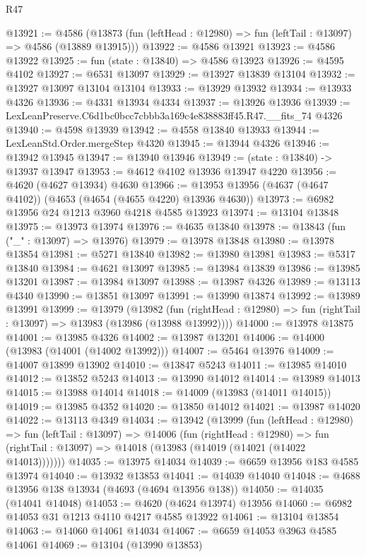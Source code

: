 \begin{lexlean}{R47}
\begin{coremodule}
@13921 := @4586
    (@13873 (fun (leftHead : @12980) => fun (leftTail : @13097) => @4586 (@13889 @13915)))
@13922 := @4586 @13921
@13923 := @4586 @13922
@13925 := fun (state : @13840) => @4586 @13923
@13926 := @4595 @4102
@13927 := @6531 @13097
@13929 := @13927 @13839 @13104
@13932 := @13927 @13097 @13104 @13104
@13933 := @13929 @13932
@13934 := @13933 @4326
@13936 := @4331 @13934 @4334
@13937 := @13926 @13936
@13939 := LexLeanPreserve.C6d1bc0bcc7cbbb3a169c4e838883ff45.R47.__fits_74 @4326
@13940 := @4598 @13939
@13942 := @4558 @13840 @13933
@13944 := LexLeanStd.Order.mergeStep @4320
@13945 := @13944 @4326
@13946 := @13942 @13945
@13947 := @13940 @13946
@13949 := (state : @13840) -> @13937 @13947
@13953 := @4612 @4102 @13936 @13947 @4220
@13956 := @4620 (@4627 @13934) @4630
@13966 := @13953 @13956 (@4637 (@4647 @4102)) (@4653 (@4654 (@4655 @4220) @13936 @4630))
@13973 := @6982 @13956 @24 @1213 @3960 @4218 @4585 @13923
@13974 := @13104 @13848
@13975 := @13973 @13974
@13976 := @4635 @13840
@13978 := @13843 (fun ("_" : @13097) => @13976)
@13979 := @13978 @13848
@13980 := @13978 @13854
@13981 := @5271 @13840
@13982 := @13980 @13981
@13983 := @5317 @13840
@13984 := @4621 @13097
@13985 := @13984 @13839
@13986 := @13985 @13201
@13987 := @13984 @13097
@13988 := @13987 @4326
@13989 := @13113 @4340
@13990 := @13851 @13097
@13991 := @13990 @13874
@13992 := @13989 @13991
@13999 := @13979
    (@13982
      (fun (rightHead : @12980) => fun (rightTail : @13097) => @13983 (@13986 (@13988 @13992))))
@14000 := @13978 @13875
@14001 := @13985 @4326
@14002 := @13987 @13201
@14006 := @14000 (@13983 (@14001 (@14002 @13992)))
@14007 := @5464 @13976
@14009 := @14007 @13899 @13902
@14010 := @13847 @5243
@14011 := @13985 @14010
@14012 := @13852 @5243
@14013 := @13990 @14012
@14014 := @13989 @14013
@14015 := @13988 @14014
@14018 := @14009 (@13983 (@14011 @14015))
@14019 := @13985 @4352
@14020 := @13850 @14012
@14021 := @13987 @14020
@14022 := @13113 @4349
@14034 := @13942
    (@13999
      (fun (leftHead : @12980) =>
      fun (leftTail : @13097) =>
      @14006
        (fun (rightHead : @12980) =>
        fun (rightTail : @13097) => @14018 (@13983 (@14019 (@14021 (@14022 @14013)))))))
@14035 := @13975 @14034
@14039 := @6659 @13956 @183 @4585 @13974
@14040 := @13932 @13853
@14041 := @14039 @14040
@14048 := @4688 @13956 @138 @13934 (@4693 (@4694 @13956 @138))
@14050 := @14035 (@14041 @14048)
@14053 := @4620 (@4624 @13974) @13956
@14060 := @6982 @14053 @31 @1213 @4110 @4217 @4585 @13922
@14061 := @13104 @13854
@14063 := @14060 @14061 @14034
@14067 := @6659 @14053 @3963 @4585 @14061
@14069 := @13104 (@13990 @13853)

\end{coremodule}
\end{lexlean}
